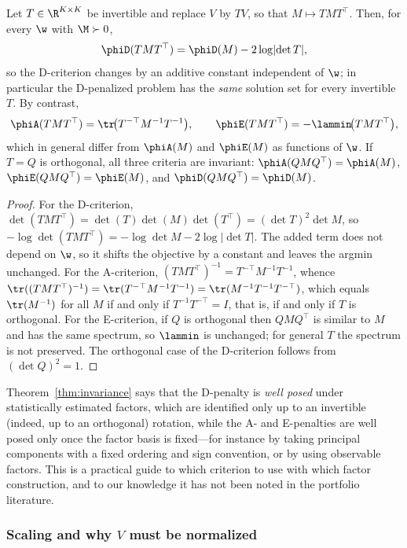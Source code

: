 \begin{theorem}
\label{thm:invariance}
Let $T\in\R^{K\times K}$ be invertible and replace $V$ by $TV$, so that
$M\mapsto TMT^\top$. Then, for every $\w$ with $\M\succ0$,
\[
  \phiD(TMT^\top)=\phiD(M)-2\log\lvert\det T\rvert ,
\]
so the D-criterion changes by an additive constant independent of $\w$; in
particular the D-penalized problem has the \emph{same} solution set for every
invertible $T$. By contrast,
\[
  \phiA(TMT^\top)=\tr\!\big(T^{-\top}M^{-1}T^{-1}\big),
  \qquad
  \phiE(TMT^\top)=-\lammin\!\big(TMT^\top\big),
\]
which in general differ from $\phiA(M)$ and $\phiE(M)$ as functions of $\w$. If
$T=Q$ is orthogonal, all three criteria are invariant:
$\phiA(QMQ^\top)=\phiA(M)$, $\phiE(QMQ^\top)=\phiE(M)$, and
$\phiD(QMQ^\top)=\phiD(M)$.
\end{theorem}

\begin{proof}
For the D-criterion, $\det(TMT^\top)=\det(T)\det(M)\det(T^\top)=(\det T)^2\det M$,
so $-\log\det(TMT^\top)=-\log\det M-2\log\lvert\det T\rvert$. The added term does
not depend on $\w$, so it shifts the objective by a constant and leaves the
argmin unchanged. For the A-criterion,
$(TMT^\top)^{-1}=T^{-\top}M^{-1}T^{-1}$, whence
$\tr((TMT^\top)^{-1})=\tr(T^{-\top}M^{-1}T^{-1})=\tr(M^{-1}T^{-1}T^{-\top})$,
which equals $\tr(M^{-1})$ for all $M$ if and only if $T^{-1}T^{-\top}=I$, that
is, if and only if $T$ is orthogonal. For the E-criterion, if $Q$ is orthogonal
then $QMQ^\top$ is similar to $M$ and has the same spectrum, so
$\lammin$ is unchanged; for general $T$ the spectrum is not preserved. The
orthogonal case of the D-criterion follows from $(\det Q)^2=1$.
\end{proof}

\begin{remark}
\label{rem:rotation}
Theorem~\ref{thm:invariance} says that the D-penalty is \emph{well posed} under
statistically estimated factors, which are identified only up to an invertible
(indeed, up to an orthogonal) rotation, while the A- and E-penalties are well
posed only once the factor basis is fixed---for instance by taking principal
components with a fixed ordering and sign convention, or by using observable
factors. This is a practical guide to which criterion to use with which factor
construction, and to our knowledge it has not been noted in the portfolio
literature.
\end{remark}

\subsubsection{Scaling and why $V$ must be normalized}

